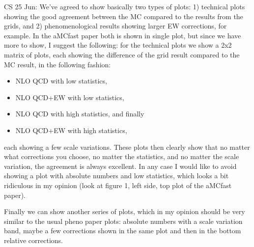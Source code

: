 CS 25 Jun: We've agreed to show basically two types of plots: 1) technical plots showing the good agreement between the MC compared to the results from the grids, and 2) phenomenological results showing larger EW corrections, for example.
In the aMCfast paper both is shown in single plot, but since we have more to show, I suggest the following: for the technical plots we show a 2x2 matrix of plots, each showing the difference of the grid result compared to the MC result, in the following fashion:
\begin{itemize}
\item NLO QCD with low statistics,
\item NLO QCD+EW with low statistics,
\item NLO QCD with high statistics, and finally
\item NLO QCD+EW with high statistics,
\end{itemize}
each showing a few scale variations.
These plots then clearly show that no matter what corrections you choose, no matter the statistics, and no matter the scale variation, the agreement is always excellent.
In any case I would like to avoid showing a plot with absolute numbers and low statistics, which looks a bit ridiculous in my opinion (look at figure 1, left side, top plot of the aMCfast paper).

Finally we can show another series of plots, which in my opinion should be very similar to the usual pheno paper plots: absolute numbers with a scale variation band, maybe a few corrections shown in the same plot and then in the bottom relative corrections.
